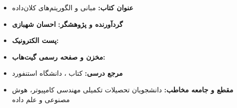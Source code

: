 \begin{summarybox}
\begin{itemize}
    \item \textbf{عنوان کتاب:} مبانی و الگوریتم‌های کلان‌داده 
    \item \textbf{گردآورنده و پژوهشگر:} \textbf{احسان شهبازی} 
    \item \textbf{پست الکترونیک:} \href{mailto:ehsan.shahbazipc@gmail.com}{}
    \item \textbf{مخزن و صفحه رسمی گیت‌هاب:} \href{https://github.com/EhsanShahbazii}{}
    \item \textbf{مرجع درسی:} کتاب ، دانشگاه استنفورد
    \item \textbf{مقطع و جامعه مخاطب:} دانشجویان تحصیلات تکمیلی مهندسی کامپیوتر، هوش مصنوعی و علم داده
\end{itemize}
\end{summarybox}
